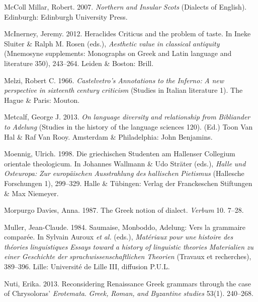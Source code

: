 \documentclass[output=paper]{langsci/langscibook}
\begin{document}
McColl Millar, Robert. 2007. \textit{Northern} \textit{and} \textit{Insular} \textit{Scots} (Dialects of English). Edinburgh: Edinburgh University Press.

McInerney, Jeremy. 2012. Heraclides Criticus and the problem of taste. In Ineke Sluiter \& Ralph M. Rosen (eds.), \textit{Aesthetic} \textit{value} \textit{in} \textit{classical} \textit{antiquity} (Mnemosyne supplements: Monographs on Greek and Latin language and literature 350), 243–264. Leiden \& Boston: Brill.

Melzi, Robert C. 1966. \textit{Castelvetro’s} \textit{Annotations} \textit{to} \textit{the} \textit{Inferno:} \textit{A} \textit{new} \textit{perspective} \textit{in} \textit{sixteenth} \textit{century} \textit{criticism} (Studies in Italian literature 1). The Hague \& Paris: Mouton.

Metcalf, George J. 2013. \textit{On} \textit{language} \textit{diversity} \textit{and} \textit{relationship} \textit{from} \textit{Bibliander} \textit{to} \textit{Adelung} (Studies in the history of the language sciences 120). (Ed.) Toon Van Hal \& Raf Van Rooy. Amsterdam \& Philadelphia: John Benjamins.

Moennig, Ulrich. 1998. Die griechischen Studenten am Hallenser Collegium orientale theologicum. In Johannes Wallmann \& Udo Sträter (eds.), \textit{Halle} \textit{und} \textit{Osteuropa:} \textit{Zur} \textit{europäischen} \textit{Ausstrahlung} \textit{des} \textit{hallischen} \textit{Pietismus} (Hallesche Forschungen 1), 299–329. Halle \& Tübingen: Verlag der Franckeschen Stiftungen \& Max Niemeyer.

Morpurgo Davies, Anna. 1987. The Greek notion of dialect. \textit{Verbum} 10. 7–28.

Muller, Jean-Claude. 1984. Saumaise, Monboddo, Adelung: Vers la grammaire comparée. In Sylvain Auroux \textit{et} \textit{al.} (eds.), \textit{Matériaux} \textit{pour} \textit{une} \textit{histoire} \textit{des} \textit{théories} \textit{linguistiques} {\textbar} \textit{Essays} \textit{toward} \textit{a} \textit{history} \textit{of} \textit{linguistic} \textit{theories} {\textbar} \textit{Materialien} \textit{zu} \textit{einer} \textit{Geschichte} \textit{der} \textit{sprachwissenschaftlichen} \textit{Theorien} (Travaux et recherches), 389–396. Lille: Université de Lille III, diffusion P.U.L.

Nuti, Erika. 2013. Reconsidering Renaissance Greek grammars through the case of Chrysoloras’ \textit{Erotemata}. \textit{Greek,} \textit{Roman,} \textit{and} \textit{Byzantine} \textit{studies} 53(1). 240–268.
\end{document}
